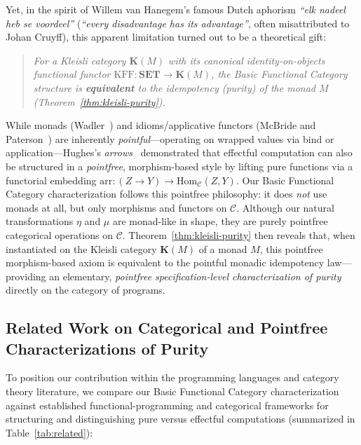 \documentclass[11pt,a4paper]{article}
\theoremstyle{definition}
\theoremstyle{remark}
\newcommand{\Set}{\mathbf{SET}}
\newcommand{\Hom}{\mathrm{Hom}}
\newcommand{\KFF}{\mathrm{KFF}}
\newcommand{\K}{\mathbf{K}}
\begin{document}
Yet, in the spirit of Willem van Hanegem's famous Dutch aphorism \emph{``elk nadeel heb se voordeel''}
(\emph{``every disadvantage has its advantage''}, often misattributed to Johan Cruyff), this apparent
limitation turned out to be a theoretical gift:
\begin{quote}
\emph{For a Kleisli category $\K(M)$ with its canonical identity-on-objects functional functor
$\KFF : \Set \to \K(M)$, the Basic Functional Category structure is \textbf{equivalent} to the
idempotency (purity) of the monad $M$ (Theorem~\ref{thm:kleisli-purity}).}
\end{quote}

While monads (Wadler~\cite{Wadler1992,Wadler1995}) and idioms/applicative functors
(McBride and Paterson~\cite{McBridePaterson2008}) are inherently \emph{pointful}---operating on
wrapped values via bind or application---Hughes's \emph{arrows}~\cite{Hughes2000} demonstrated that
effectful computation can also be structured in a \emph{pointfree}, morphism-based style by lifting
pure functions via a functorial embedding $\mathrm{arr} : (Z \to Y) \to \Hom_{\mathcal{C}}(Z, Y)$.
Our Basic Functional Category characterization follows this pointfree philosophy: it does \emph{not}
use monads at all, but only morphisms and functors on $\mathcal{C}$. Although our natural
transformations $\eta$ and $\mu$ are monad-like in shape, they are purely pointfree categorical
operations on $\mathcal{C}$. Theorem~\ref{thm:kleisli-purity} then reveals that, when instantiated
on the Kleisli category $\K(M)$ of a monad $M$, this pointfree morphism-based axiom is equivalent
to the pointful monadic idempotency law---providing an elementary, \emph{pointfree
specification-level characterization of purity} directly on the category of programs.

\subsection{Related Work on Categorical and Pointfree Characterizations of Purity}\label{sec:related}

To position our contribution within the programming languages and category theory literature, we
compare our Basic Functional Category characterization against established functional-programming
and categorical frameworks for structuring and distinguishing pure versus effectful computations
(summarized in Table~\ref{tab:related}):
\end{document}
